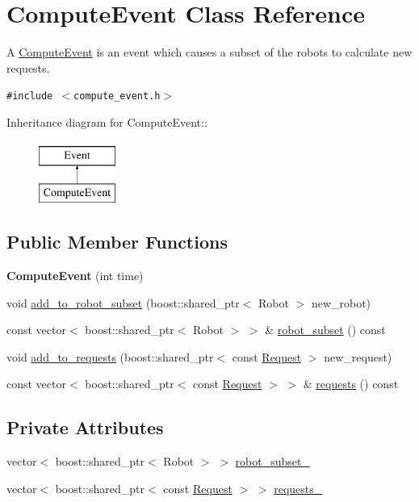 \hypertarget{class_compute_event}{
\section{ComputeEvent Class Reference}
\label{class_compute_event}
}
A \hyperlink{class_compute_event}{ComputeEvent} is an event which causes a subset of the robots to calculate new requests.  


{\tt \#include $<$compute\_\-event.h$>$}

Inheritance diagram for ComputeEvent::\begin{figure}[H]
\begin{center}
\leavevmode
\includegraphics[height=2cm]{class_compute_event}
\end{center}
\end{figure}
\subsection*{Public Member Functions}
\begin{CompactItemize}
\item 
\hypertarget{class_compute_event_4dc6eee8abfa25658b1cf2b9661ff540}{
\textbf{ComputeEvent} (int time)}
\label{class_compute_event_4dc6eee8abfa25658b1cf2b9661ff540}

\item 
void \hyperlink{class_compute_event_7268b70a949c8e9fb1116a1ced0e0071}{add\_\-to\_\-robot\_\-subset} (boost::shared\_\-ptr$<$ Robot $>$ new\_\-robot)
\item 
const vector$<$ boost::shared\_\-ptr$<$ Robot $>$ $>$ \& \hyperlink{class_compute_event_ab47f53949412a2ae5f182206aebf438}{robot\_\-subset} () const 
\item 
void \hyperlink{class_compute_event_97884cf9d3eebb04629883c239a7ecfa}{add\_\-to\_\-requests} (boost::shared\_\-ptr$<$ const \hyperlink{class_request}{Request} $>$ new\_\-request)
\item 
const vector$<$ boost::shared\_\-ptr$<$ const \hyperlink{class_request}{Request} $>$ $>$ \& \hyperlink{class_compute_event_0e685c0e02288e058d59f7eeff83b74d}{requests} () const 
\end{CompactItemize}
\subsection*{Private Attributes}
\begin{CompactItemize}
\item 
vector$<$ boost::shared\_\-ptr$<$ Robot $>$ $>$ \hyperlink{class_compute_event_2dbee5c3df3a079df940e2992b0afc30}{robot\_\-subset\_\-}
\item 
vector$<$ boost::shared\_\-ptr$<$ const \hyperlink{class_request}{Request} $>$ $>$ \hyperlink{class_compute_event_31c8515c8d6eeddecf1111fc8fd0ba67}{requests\_\-}
\end{CompactItemize}


